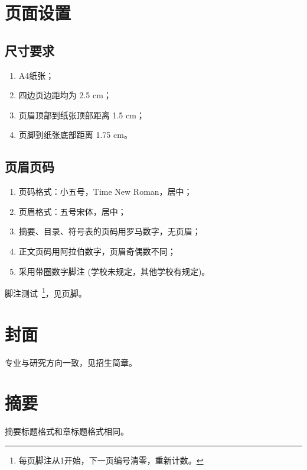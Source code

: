 \section{页面设置}

\subsection{尺寸要求}

\begin{enumerate}
	\item A4纸张；
	\item 四边页边距均为 2.5 cm；
	\item 页眉顶部到纸张顶部距离 1.5 cm；
	\item 页脚到纸张底部距离 1.75 cm。
\end{enumerate}

\subsection{页眉页码}

\begin{enumerate}
	\item 页码格式：小五号，Time New Roman，居中；
	\item 页眉格式：五号宋体，居中；
	\item 摘要、目录、符号表的页码用罗马数字，无页眉；
	\item 正文页码用阿拉伯数字，页眉奇偶数不同；
	\item 采用带圈数字脚注 (学校未规定，其他学校有规定)。
\end{enumerate}

脚注测试~\footnote{每页脚注从1开始，下一页编号清零，重新计数。}，见页脚。

\section{封面}

专业与研究方向一致，见招生简章。

\section{摘要}

摘要标题格式和章标题格式相同。


